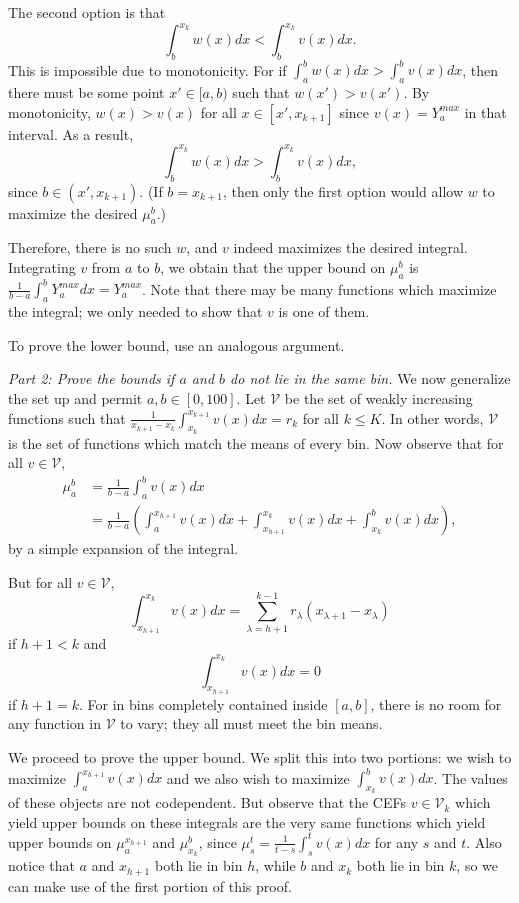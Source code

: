 The second option is that $$ \int_{b}^{x_k}
w(x)dx < \int_{b}^{x_k}
v(x)dx .$$ This is impossible due to monotonicity. For if $ \int_{a}^{b}
w(x)dx > \int_{a}^{b}
v(x)dx$, then there must be some point $x' \in [a,b)$ such that $w(x')
> v(x')$. By monotonicity, $w(x) > v(x)$ for all $x \in [x',x_{k+1}]$
since $v(x) =Y_a^{max}$ in that interval. As a result,  $$ \int_{b}^{x_k}
w(x)dx > \int_{b}^{x_k}
v(x)dx,$$ since $b \in (x',x_{k+1})$. (If $b = x_{k+1}$, then only the
first option would allow $w$ to maximize the desired $\mu_a^b$.) 

Therefore, there is no such $w$, and $v$ indeed maximizes the desired integral. Integrating $v$ from
$a$ to $b$, we obtain that the upper bound on $\mu_a^b$ is
$\frac{1}{b-a} \int_a^b Y_a^{max} dx = Y_a^{max}$. Note that there may
be many functions which maximize the integral; we only needed to show
that $v$ is one of them. 

To prove the lower bound, use an analogous argument. 

\textit{Part 2: Prove the bounds if $a$ and $b$ do not lie in the same
bin.} We now generalize the set up and permit $a,b \in [0,100]$. Let
  $\mathcal{V}$ be the set of weakly increasing functions such that $\frac{1}{x_{k+1} -
  x_k} \int_{x_k}^{x_{k+1}}
v(x) dx = r_k$ for all $k \leq K$. In other words, $\mathcal{V}$ is the set of
  functions which match the means of every bin. Now observe that for all $v \in \mathcal{V}$, 
\begin{align*}
\mu_a^b &= \frac{1}{b-a}\int_a^b v(x) dx \\ 
&= \frac{1}{b-a} \left(
\int_a^{x_{h+1}} v(x)dx + \int_{x_{h+1}}^{x_k} v(x)dx +
\int_{x_k}^{b} v(x) dx \right), 
\end{align*} 
by a simple expansion of the integral. 

But for all $v \in \mathcal{V}$, $$\int_{x_{h+1}}^{x_k} v(x)dx = \sum_{\lambda =
  h+1}^{k-1} r_{\lambda}
    (x_{\lambda+1} - x_{\lambda})$$ if $h + 1 <k$
and $$\int_{x_{h+1}}^{x_k} v(x)dx = 0$$ if $h + 1 = k$. For in
  bins completely contained inside $[a,b]$, there is no room for any
  function in $\mathcal{V}$ to vary; they all must meet the bin means. 

We proceed to prove the upper bound. We split this into two portions:
we wish to maximize $\int_a^{x_{h+1}}v(x)dx $ and we also wish to maximize $\int_{x_k}^b v(x)dx $. The values of
these objects are not codependent. But observe that the CEFs $v \in
\mathcal{V}_k$ which yield upper bounds on these integrals are the very same functions which yield upper bounds on
$\mu_a^{x_{h+1}} $ and $\mu_{x_k}^b$, since $\mu_s^t
= \frac{1}{t-s} \int_s^t v(x) dx$ for any $s$ and $t$. Also notice
that $a$ and $x_{h+1}$ both lie in bin $h$, while $b$ and $x_k$ both
lie in bin $k$, so we can make use of 
the first portion of this proof. 

